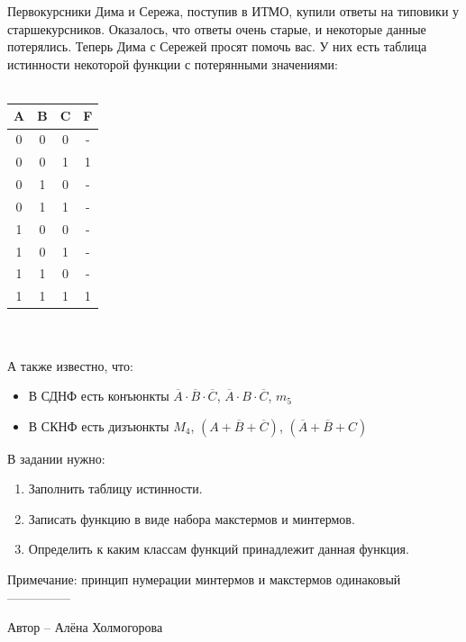 \question
Первокурсники Дима и Сережа, поступив в ИТМО, купили ответы на типовики у старшекурсников. Оказалось, что ответы очень старые, и некоторые данные потерялись. Теперь Дима с Сережей просят помочь вас. У них есть таблица истинности некоторой функции с потерянными значениями:
\\
\\
\begin{tabular}{c|c|c||c|}
     \hline
     A & B & C & F \\
     \hline
     0 & 0 & 0 & - \\
     0 & 0 & 1 & 1 \\
     0 & 1 & 0 & - \\
     0 & 1 & 1 & - \\
     1 & 0 & 0 & - \\
     1 & 0 & 1 & - \\
     1 & 1 & 0 & - \\
     1 & 1 & 1 & 1 \\
\end{tabular}
\\
\\
А также известно, что:
\begin{itemize}
    \item В СДНФ есть конъюнкты $\overline{A}\cdot\overline{B}\cdot\overline{C}$, $\overline{A}\cdot B\cdot\overline{C}$, $m_5$
    \item В СКНФ есть дизъюнкты $M_4$, $(A+\overline{B}+\overline{C})$, $(\overline{A}+\overline{B}+C)$
\end{itemize}
\par\medskip
В задании нужно:
\begin{enumerate}
    \item Заполнить таблицу истинности.
    \item Записать функцию в виде набора макстермов и минтермов.
    \item Определить к каким классам функций принадлежит данная функция.
\end{enumerate} 

Примечание: принцип нумерации минтермов и макстермов одинаковый
\\
---------------

Автор -- Алёна Холмогорова